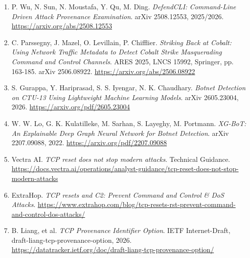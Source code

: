\documentclass[10pt,a4paper]{article}
\begin{document}
\begin{enumerate}
    \item[{[8]}] P. Wu, N. Sun, N. Moustafa, Y. Qu, M. Ding. \textit{DefendCLI: Command-Line Driven Attack Provenance Examination}. arXiv 2508.12553, 2025/2026.\newline
    \url{https://arxiv.org/abs/2508.12553}

    \item[{[9]}] C. Parssegny, J. Mazel, O. Levillain, P. Chifflier. \textit{Striking Back at Cobalt: Using Network Traffic Metadata to Detect Cobalt Strike Masquerading Command and Control Channels}. ARES 2025, LNCS 15992, Springer, pp. 163-185. arXiv 2506.08922.\newline
    \url{https://arxiv.org/abs/2506.08922}

    \item[{[10]}] S. Gurappa, Y. Hariprasad, S. S. Iyengar, N. K. Chaudhary. \textit{Botnet Detection on CTU-13 Using Lightweight Machine Learning Models}. arXiv 2605.23004, 2026.\newline
    \url{https://arxiv.org/pdf/2605.23004}

    \item[{[11]}] W. W. Lo, G. K. Kulatilleke, M. Sarhan, S. Layeghy, M. Portmann. \textit{XG-BoT: An Explainable Deep Graph Neural Network for Botnet Detection}. arXiv 2207.09088, 2022.\newline
    \url{https://arxiv.org/pdf/2207.09088}

    \item[{[12]}] Vectra AI. \textit{TCP reset does not stop modern attacks}. Technical Guidance.\newline
    \url{https://docs.vectra.ai/operations/analyst-guidance/tcp-reset-does-not-stop-modern-attacks}

    \item[{[13]}] ExtraHop. \textit{TCP resets and C2: Prevent Command and Control \& DoS Attacks}.\newline
    \url{https://www.extrahop.com/blog/tcp-resets-rst-prevent-command-and-control-dos-attacks/}

    \item[{[14]}] B. Liang, et al. \textit{TCP Provenance Identifier Option}. IETF Internet-Draft, draft-liang-tcp-provenance-option, 2026.\newline
    \url{https://datatracker.ietf.org/doc/draft-liang-tcp-provenance-option/}
\end{enumerate}
\end{document}
